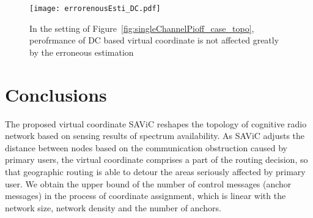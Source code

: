 \begin{figure}[ht]
	\centering
    \texttt{[image: errorenousEsti\_DC.pdf]}
    \caption{In the setting of Figure~\ref{fig:singleChannelPioff_case_topo}, perofrmance of DC based virtual coordinate is not affected greatly by the erroneous estimation} 			\label{fig:errorenousEsti_DC}
\end{figure}




\section{Conclusions}
The proposed virtual coordinate SAViC reshapes the topology of cognitive radio network based on sensing results of spectrum availability.
As SAViC adjusts the distance between nodes based on the communication obstruction caused by primary users, the virtual coordinate comprises a part of the routing decision, so that geographic routing is able to detour the areas seriously affected by primary user.
We obtain the upper bound of the number of control messages (anchor messages) in the process of coordinate assignment, which is linear with the network size, network density and the number of anchors.

